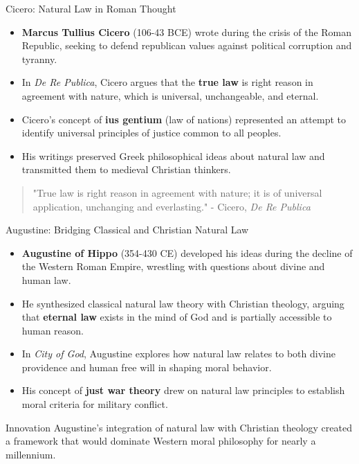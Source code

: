 \documentclass{beamer}
\begin{document}
\begin{frame}{Cicero: Natural Law in Roman Thought}
    \begin{itemize}
        \item \textbf{Marcus Tullius Cicero} (106-43 BCE) wrote during the crisis of the Roman Republic, seeking to defend republican values against political corruption and tyranny.
        
        \item In \textit{De Re Publica}, Cicero argues that the \textbf{true law} is right reason in agreement with nature, which is universal, unchangeable, and eternal.
        
        \item Cicero's concept of \textbf{ius gentium} (law of nations) represented an attempt to identify universal principles of justice common to all peoples.
        
        \item His writings preserved Greek philosophical ideas about natural law and transmitted them to medieval Christian thinkers.
    \end{itemize}
    
    \begin{quote}
        "True law is right reason in agreement with nature; it is of universal application, unchanging and everlasting." - Cicero, \textit{De Re Publica}
    \end{quote}
\end{frame}

\begin{frame}{Augustine: Bridging Classical and Christian Natural Law}
    \begin{itemize}
        \item \textbf{Augustine of Hippo} (354-430 CE) developed his ideas during the decline of the Western Roman Empire, wrestling with questions about divine and human law.
        
        \item He synthesized classical natural law theory with Christian theology, arguing that \textbf{eternal law} exists in the mind of God and is partially accessible to human reason.
        
        \item In \textit{City of God}, Augustine explores how natural law relates to both divine providence and human free will in shaping moral behavior.
        
        \item His concept of \textbf{just war theory} drew on natural law principles to establish moral criteria for military conflict.
    \end{itemize}
    
    \begin{alertblock}{Innovation}
        Augustine's integration of natural law with Christian theology created a framework that would dominate Western moral philosophy for nearly a millennium.
    \end{alertblock}
\end{frame}
\end{document}
